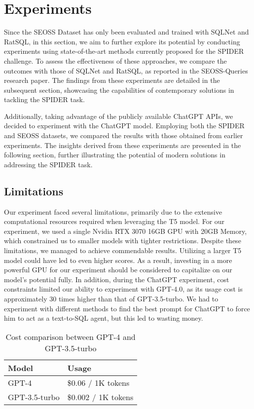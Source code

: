\section{Experiments}

Since the SEOSS Dataset\cite{RATH2019104005} has only been evaluated and trained with SQLNet and RatSQL, in this section, we aim to further explore its potential by conducting experiments using state-of-the-art methods currently proposed for the SPIDER challenge. To assess the effectiveness of these approaches, we compare the outcomes with those of SQLNet and RatSQL, as reported in the SEOSS-Queries research paper\cite{TOMOVA2022108211}. The findings from these experiments are detailed in the subsequent section, showcasing the capabilities of contemporary solutions in tackling the SPIDER task.

Additionally, taking advantage of the publicly available ChatGPT APIs, we decided to experiment with the ChatGPT model. Employing both the SPIDER and SEOSS datasets, we compared the results with those obtained from earlier experiments. The insights derived from these experiments are presented in the following section, further illustrating the potential of modern solutions in addressing the SPIDER task.

\subsection{Limitations}

Our experiment faced several limitations, primarily due to the extensive computational resources required when leveraging the T5 model. For our experiment, we used a single Nvidia RTX 3070 16GB GPU with 20GB Memory, which constrained us to smaller models with tighter restrictions. Despite these limitations, we managed to achieve commendable results. Utilizing a larger T5 model could have led to even higher scores. As a result, investing in a more powerful GPU for our experiment should be considered to capitalize on our model's potential fully.
In addition, during the ChatGPT experiment, cost constraints limited our ability to experiment with GPT-4.0, as its usage cost is approximately 30 times higher than that of GPT-3.5-turbo. We had to experiment with different methods to find the best prompt for ChatGPT to force him to act as a text-to-SQL agent, but this led to wasting money.

\begin{table}[h]
    \centering
    \begin{tabular}{|l|l|}
        \hline \textbf{Model} & \textbf{Usage}      \\
        \hline GPT-4          & \$0.06 / 1K tokens  \\
        \hline GPT-3.5-turbo  & \$0.002 / 1K tokens \\
        \hline
    \end{tabular}
    \caption{Cost comparison between GPT-4 and GPT-3.5-turbo}
    \label{tab:cost_comparison}
\end{table}




\clearpage

